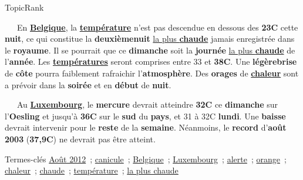 \begin{frame}{TopicRank}
{\begin{textblock*}{\textwidth}
\begin{exampleblock}
        ~~~En \textbf{\underline{Belgique}}, la \textbf{\underline{température}}
        n'est pas descendue en dessous des \textbf{23\degre{}C} cette
        \textbf{nuit}, ce qui constitue la \textbf{deuxième\textvisiblespace nuit}
        \underline{la plus \textbf{chaude}} jamais enregistrée dans le
        \textbf{royaume}. Il se pourrait que ce \textbf{dimanche} soit la
        \textbf{journée} \underline{la plus \textbf{chaude}} de l'\textbf{année}.
        Les \textbf{\underline{températures}} seront comprises entre 33 et
        \textbf{38\degre{}C}. Une \textbf{légère\textvisiblespace brise} de
        \textbf{côte} pourra faiblement rafraichir l'\textbf{atmosphère}. Des
        \textbf{orages} de \textbf{\underline{chaleur}} sont a prévoir dans la
        \textbf{soirée} et en \textbf{début} de \textbf{nuit}.

        ~~~Au \textbf{\underline{Luxembourg}}, le \textbf{mercure} devrait
        atteindre \textbf{32\degre{}C} ce \textbf{dimanche} sur l'\textbf{Oesling}
        et jusqu'à \textbf{36\degre{}C} sur le \textbf{sud} du \textbf{pays}, et
        31 à 32\degre{}C \textbf{lundi}. Une \textbf{baisse} devrait intervenir
        pour le \textbf{reste} de la \textbf{semaine}. Néanmoins, le
        \textbf{record} d'\textbf{août 2003} (\textbf{37,9\degre{}C}) ne devrait
        pas être atteint.

        \begin{exampleblock}{\small Termes-clés}\justifying\small
          \underline{Août 2012}~; \underline{canicule}~;
          \underline{Belgique}~; \underline{Luxembourg}~; \underline{alerte}~;
          \underline{orange}~; \underline{chaleur}~; \underline{chaude}~;
          \underline{température}~; \underline{la plus chaude}
        \end{exampleblock}
      \end{exampleblock}
    \end{textblock*}
  }
\end{frame}


